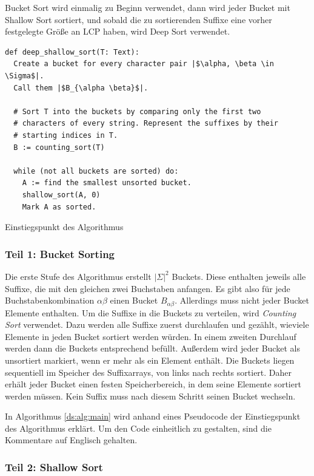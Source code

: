 Bucket Sort wird einmalig zu Beginn verwendet, dann wird jeder Bucket mit Shallow Sort sortiert, und sobald die zu sortierenden Suffixe eine vorher festgelegte Größe an LCP haben, wird Deep Sort verwendet.

\begin{listing}
\begin{verbatim}
def deep_shallow_sort(T: Text):
  Create a bucket for every character pair |$\alpha, \beta \in \Sigma$|.
  Call them |$B_{\alpha \beta}$|.

  # Sort T into the buckets by comparing only the first two
  # characters of every string. Represent the suffixes by their
  # starting indices in T.
  B := counting_sort(T)

  while (not all buckets are sorted) do:
    A := find the smallest unsorted bucket.
    shallow_sort(A, 0)
    Mark A as sorted.
\end{verbatim}
\caption{Einstiegspunkt des Algorithmus}
\label{ds:alg:main}
\end{listing}

\subsubsection{Teil 1: Bucket Sorting}

Die erste Stufe des Algorithmus erstellt $|\Sigma|^2$ Buckets.
Diese enthalten jeweils alle Suffixe, die mit den gleichen zwei Buchstaben anfangen.
Es gibt also für jede Buchstabenkombination $\alpha\beta$ einen Bucket $B_{\alpha\beta}$.
Allerdings muss nicht jeder Bucket Elemente enthalten.
Um die Suffixe in die Buckets zu verteilen, wird \textit{Counting Sort} verwendet.
Dazu werden alle Suffixe zuerst durchlaufen und gezählt, wieviele Elemente in jeden Bucket sortiert werden würden.
In einem zweiten Durchlauf werden dann die Buckets entsprechend befüllt.
Außerdem wird jeder Bucket als unsortiert markiert, wenn er mehr als ein Element enthält.
Die Buckets liegen sequentiell im Speicher des Suffixarrays, von links nach rechts sortiert.
Daher erhält jeder Bucket einen festen Speicherbereich, in dem seine Elemente sortiert werden müssen.
Kein Suffix muss nach diesem Schritt seinen Bucket wechseln.

In Algorithmus \ref{ds:alg:main} wird anhand eines Pseudocode der Einstiegspunkt des Algorithmus erklärt.
Um den Code einheitlich zu gestalten, sind die Kommentare auf Englisch gehalten.

\subsubsection{Teil 2: Shallow Sort}

